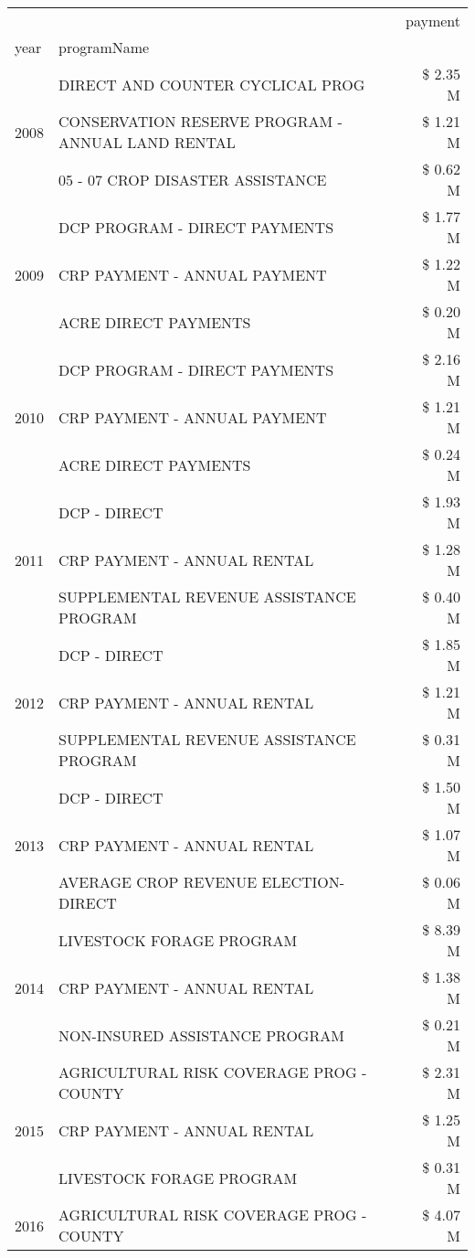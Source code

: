 \begin{tabular}{llr}
\toprule
 &  & payment \\
year & programName &  \\
\midrule
\multirow[t]{3}{*}{2008} & DIRECT AND COUNTER CYCLICAL PROG & \$ 2.35 M \\
 & CONSERVATION RESERVE PROGRAM - ANNUAL LAND RENTAL & \$ 1.21 M \\
 & 05 - 07 CROP DISASTER ASSISTANCE & \$ 0.62 M \\
\cline{1-3}
\multirow[t]{3}{*}{2009} & DCP PROGRAM - DIRECT PAYMENTS & \$ 1.77 M \\
 & CRP PAYMENT - ANNUAL PAYMENT & \$ 1.22 M \\
 & ACRE DIRECT PAYMENTS & \$ 0.20 M \\
\cline{1-3}
\multirow[t]{3}{*}{2010} & DCP PROGRAM - DIRECT PAYMENTS & \$ 2.16 M \\
 & CRP PAYMENT - ANNUAL PAYMENT & \$ 1.21 M \\
 & ACRE DIRECT PAYMENTS & \$ 0.24 M \\
\cline{1-3}
\multirow[t]{3}{*}{2011} & DCP - DIRECT & \$ 1.93 M \\
 & CRP PAYMENT - ANNUAL RENTAL & \$ 1.28 M \\
 & SUPPLEMENTAL REVENUE ASSISTANCE PROGRAM & \$ 0.40 M \\
\cline{1-3}
\multirow[t]{3}{*}{2012} & DCP - DIRECT & \$ 1.85 M \\
 & CRP PAYMENT - ANNUAL RENTAL & \$ 1.21 M \\
 & SUPPLEMENTAL REVENUE ASSISTANCE PROGRAM & \$ 0.31 M \\
\cline{1-3}
\multirow[t]{3}{*}{2013} & DCP - DIRECT & \$ 1.50 M \\
 & CRP PAYMENT - ANNUAL RENTAL & \$ 1.07 M \\
 & AVERAGE CROP REVENUE ELECTION-DIRECT & \$ 0.06 M \\
\cline{1-3}
\multirow[t]{3}{*}{2014} & LIVESTOCK FORAGE PROGRAM & \$ 8.39 M \\
 & CRP PAYMENT - ANNUAL RENTAL & \$ 1.38 M \\
 & NON-INSURED ASSISTANCE PROGRAM & \$ 0.21 M \\
\cline{1-3}
\multirow[t]{3}{*}{2015} & AGRICULTURAL RISK COVERAGE PROG - COUNTY & \$ 2.31 M \\
 & CRP PAYMENT - ANNUAL RENTAL & \$ 1.25 M \\
 & LIVESTOCK FORAGE PROGRAM & \$ 0.31 M \\
\cline{1-3}
\multirow[t]{3}{*}{2016} & AGRICULTURAL RISK COVERAGE PROG - COUNTY & \$ 4.07 M \\

\end{tabular}
